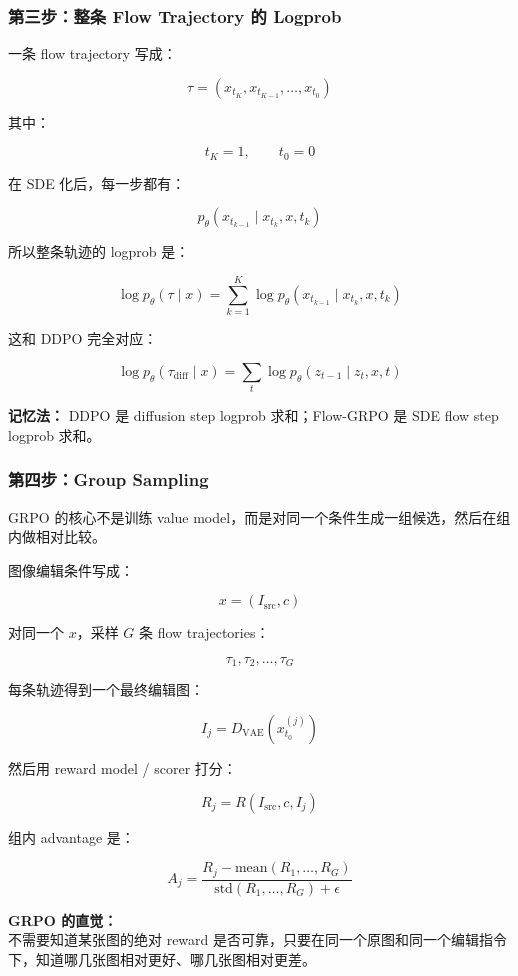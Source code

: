 \subsubsection{第三步：整条 Flow Trajectory 的 Logprob}

一条 flow trajectory 写成：

\[
\tau
=
\left(
x_{t_K},x_{t_{K-1}},\ldots,x_{t_0}
\right)
\]

其中：

\[
t_K=1,
\qquad
t_0=0
\]

在 SDE 化后，每一步都有：

\[
p_\theta(x_{t_{k-1}}\mid x_{t_k},x,t_k)
\]

所以整条轨迹的 logprob 是：

\[
\log p_\theta(\tau\mid x)
=
\sum_{k=1}^{K}
\log
p_\theta(x_{t_{k-1}}\mid x_{t_k},x,t_k)
\]

这和 DDPO 完全对应：

\[
\log p_\theta(\tau_\text{diff}\mid x)
=
\sum_t
\log p_\theta(z_{t-1}\mid z_t,x,t)
\]

\begin{intubox}
\textbf{记忆法：} DDPO 是 diffusion step logprob 求和；Flow-GRPO 是 SDE flow step logprob 求和。
\end{intubox}

\subsubsection{第四步：Group Sampling}

GRPO 的核心不是训练 value model，而是对同一个条件生成一组候选，然后在组内做相对比较。

图像编辑条件写成：

\[
x=(I_\text{src},c)
\]

对同一个 $x$，采样 $G$ 条 flow trajectories：

\[
\tau_1,\tau_2,\ldots,\tau_G
\]

每条轨迹得到一个最终编辑图：

\[
I_j
=
D_\text{VAE}(x_{t_0}^{(j)})
\]

然后用 reward model / scorer 打分：

\[
R_j
=
R(I_\text{src},c,I_j)
\]

组内 advantage 是：

\[
A_j
=
\frac{
R_j-\text{mean}(R_1,\ldots,R_G)
}{
\text{std}(R_1,\ldots,R_G)+\epsilon
}
\]

\begin{summarybox}
\textbf{GRPO 的直觉：}\\
不需要知道某张图的绝对 reward 是否可靠，只要在同一个原图和同一个编辑指令下，知道哪几张图相对更好、哪几张图相对更差。
\end{summarybox}

